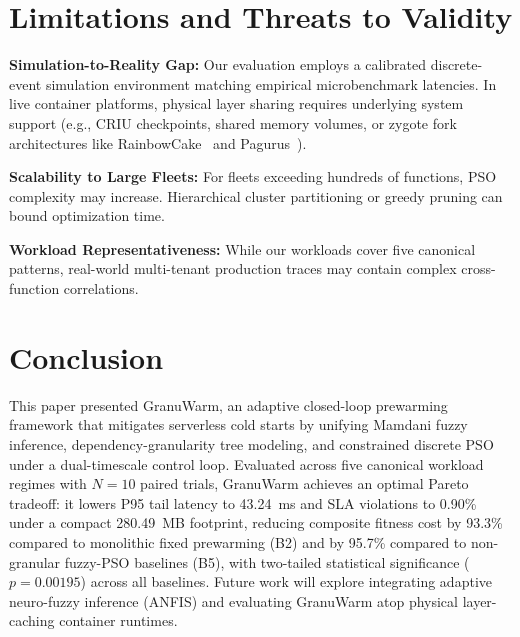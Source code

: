 \documentclass[final,5p,times,twocolumn]{elsarticle}
\begin{document}
\section{Limitations and Threats to Validity}

\textbf{Simulation-to-Reality Gap:} Our evaluation employs a calibrated discrete-event simulation environment matching empirical microbenchmark latencies. In live container platforms, physical layer sharing requires underlying system support (e.g., CRIU checkpoints, shared memory volumes, or zygote fork architectures like RainbowCake~\cite{rainbowcake2024} and Pagurus~\cite{pagurus2022}).

\textbf{Scalability to Large Fleets:} For fleets exceeding hundreds of functions, PSO complexity may increase. Hierarchical cluster partitioning or greedy pruning can bound optimization time.

\textbf{Workload Representativeness:} While our workloads cover five canonical patterns, real-world multi-tenant production traces may contain complex cross-function correlations.

\section{Conclusion}

This paper presented GranuWarm, an adaptive closed-loop prewarming framework that mitigates serverless cold starts by unifying Mamdani fuzzy inference, dependency-granularity tree modeling, and constrained discrete PSO under a dual-timescale control loop. Evaluated across five canonical workload regimes with $N = 10$ paired trials, GranuWarm achieves an optimal Pareto tradeoff: it lowers P95 tail latency to 43.24~ms and SLA violations to 0.90\% under a compact 280.49~MB footprint, reducing composite fitness cost by 93.3\% compared to monolithic fixed prewarming (B2) and by 95.7\% compared to non-granular fuzzy-PSO baselines (B5), with two-tailed statistical significance ($p = 0.00195$) across all baselines. Future work will explore integrating adaptive neuro-fuzzy inference (ANFIS) and evaluating GranuWarm atop physical layer-caching container runtimes.
\end{document}
